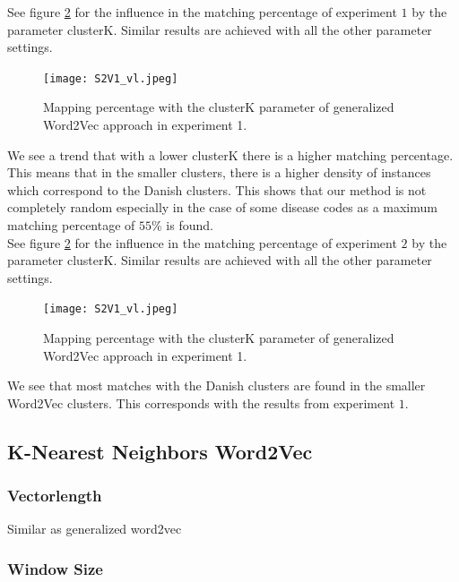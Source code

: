 See figure \ref{fig:s2v_vl_1} for the influence in the matching percentage of experiment $1$ by the parameter clusterK. Similar results are achieved with all the other parameter settings. \\

\begin{figure}[!htb]
	\centering
	\texttt{[image: S2V1\_vl.jpeg]}
	\caption{Mapping percentage with the clusterK parameter of generalized Word2Vec approach in experiment 1.}
	\label{fig:s2v_vl_1}
\end{figure}

\noindent We see a trend that with a lower clusterK there is a higher matching percentage. This means that in the smaller clusters, there is a higher density of instances which correspond to the Danish clusters. This shows that our method is not completely random especially in the case of some disease codes as a maximum matching percentage of $55$\% is found. \\

\noindent See figure \ref{fig:s2v_vl_1} for the influence in the matching percentage of experiment $2$ by the parameter clusterK. Similar results are achieved with all the other parameter settings. \\

\begin{figure}[!htb]
	\centering
	\texttt{[image: S2V1\_vl.jpeg]}
	\caption{Mapping percentage with the clusterK parameter of generalized Word2Vec approach in experiment 1.}
	\label{fig:s2v_vl_1}
\end{figure}

\noindent We see that most matches with the Danish clusters are found in the smaller Word2Vec clusters. This corresponds with the results from experiment $1$.

\subsection{K-Nearest Neighbors Word2Vec}

\subsubsection*{Vectorlength}

Similar as generalized word2vec

\subsubsection*{Window Size}

